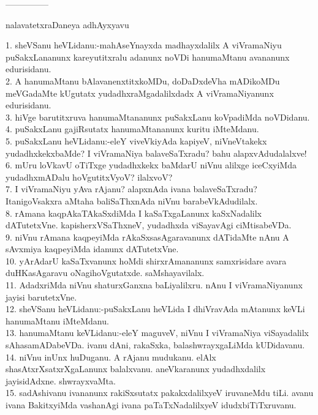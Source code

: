 \documentclass{article}
\begin{document}
\begin{center}
---------------
\end{center}

\begin{center}
nalavatetxraDaneya adhAyxyavu
\end{center}

1. sheVSanu heVLidanu:-mahAseYnayxda madhayxdalilx A viVramaNiyu puSakxLananunx kareyutitxralu adanunx noVDi hanumaMtanu avananunx edurisidanu.\\
2. A hanumaMtanu bAlavanenxtitxkoMDu, doDaDxdeVha mADikoMDu meVGadaMte kUgutatx yudadhxraMgadalilxdadx A viVramaNiyanunx edurisidanu.\\
3. hiVge barutitxruva hanumaMtananunx puSakxLanu koVpadiMda noVDidanu.\\
4. puSakxLanu gajiRsutatx hanumaMtananunx kuritu iMteMdanu.\\
5. puSakxLanu heVLidanu:-eleY viveVkiyAda kapiyeV, niVneVtakekx yudadhxkekxbaMde? I viVramaNiya balaveSaTxradu? bahu alapxvAdudalalxve!\\
6. mUru loVkavU oTiTxge yudadhxkekx baMdarU niVnu alilxge iceCxyiMda yudadhxmADalu hoVgutitxVyoV? ilalxvoV?\\
7. I viVramaNiyu yAva rAjanu? alapxnAda ivana balaveSaTxradu? ItanigoVsakxra aMtaha baliSaThxnAda niVnu barabeVkAdudilalx.\\
8. rAmana kaqpAkaTAkaSxdiMda I kaSaTxgaLanunx kaSxNadalilx dATutetxVne. kapisherxVSaThxneV, yudadhxda viSayavAgi ciMtisabeVDa.\\
9. niVnu rAmana kaqpeyiMda rAkaSxsasAgaravanunx dATidaMte nAnu A sAvxmiya kaqpeyiMda idanunx dATutetxVne.\\
10. yArAdarU kaSaTxvanunx hoMdi shirxrAmananunx samxrisidare avara duHKasAgaravu oNagihoVgutatxde. saMshayavilalx.\\
11. AdadxriMda niVnu shaturxGanxna baLiyalilxru. nAnu I viVramaNiyanunx jayisi barutetxVne.\\
12. sheVSanu heVLidanu:-puSakxLanu heVLida I dhiVravAda mAtanunx keVLi hanumaMtanu iMteMdanu.\\
13. hanumaMtanu keVLidanu:-eleY maguveV, niVnu I viVramaNiya viSayadalilx sAhasamADabeVDa. ivanu dAni, rakaSxka, balashwrayxgaLiMda kUDidavanu.\\
14. niVnu inUnx huDuganu. A rAjanu mudukanu. elAlx shasAtxrXsatxrXgaLanunx balalxvanu. aneVkaranunx yudadhxdalilx jayisidAdxne. shwrayxvaMta.\\
15. sadAshivanu ivananunx rakiSxsutatx pakakxdalilxyeV iruvaneMdu tiLi. avanu ivana BakitxyiMda vashanAgi ivana paTaTxNadalilxyeV idudxbiTiTxruvanu.\\
\end{document}
